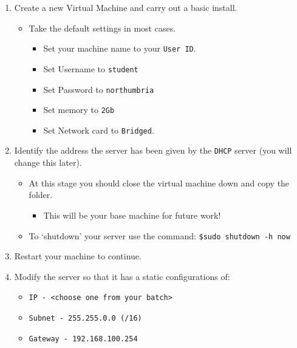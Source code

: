 \documentclass[11pt]{article}
\begin{document}
\begin{enumerate}
    \item Create a new Virtual Machine and carry out a basic install.
        \begin{itemize}
            \item Take the default settings in most cases.
                \begin{itemize}
                    \item Set your machine name to your \texttt{User ID}.
                    \item Set Username to \texttt{student}
                    \item Set Password to \texttt{northumbria}
                    \item Set memory to \texttt{2Gb}
                    \item Set Network card to \texttt{Bridged}.
                \end{itemize}
        \end{itemize}
    \item Identify the address the server has been given by the \texttt{DHCP} server (you will change this later). 
        \begin{tcolorbox}[title={\textbf{Notes:}}]
            \begin{itemize}
                \item At this stage you should close the virtual machine down and copy the folder.
                    \begin{itemize}
                        \item This will be your base machine for future work!
                    \end{itemize} 
                \item To `shutdown' your server use the command: \texttt{\$sudo shutdown -h now} 
            \end{itemize}
        \end{tcolorbox}
    \item Restart your machine to continue.
    \item Modify the server so that it has a static configurations of: 
        \begin{itemize}
            \item \texttt{IP - <choose one from your batch>}
            \item \texttt{Subnet - 255.255.0.0 (/16)}
            \item \texttt{Gateway - 192.168.100.254}

\end{itemize}
\end{enumerate}
\end{document}
